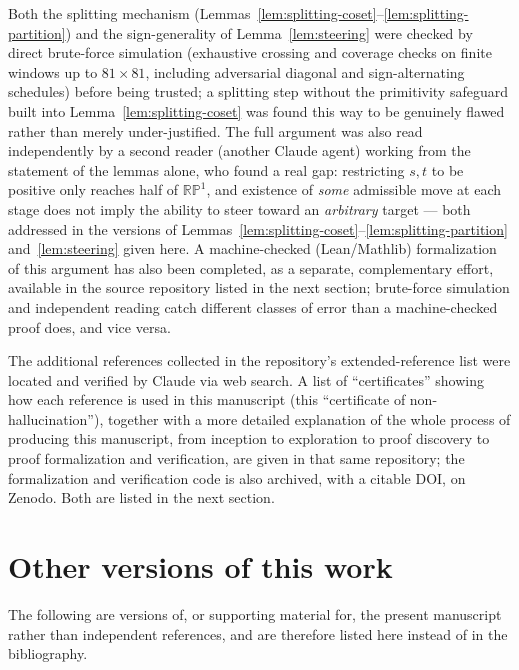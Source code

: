 \documentclass[a4paper,11pt,oneside,reqno]{amsart}
\theoremstyle{definition}
\theoremstyle{remark}
\theoremstyle{plain}
\newcommand{\RP}{\mathbb{RP}^1}
\begin{document}
Both the splitting mechanism (Lemmas~\ref{lem:splitting-coset}--\ref{lem:splitting-partition}) and
the sign-generality of Lemma~\ref{lem:steering} were checked by direct brute-force simulation
(exhaustive crossing and coverage checks on finite windows up to \(81\times81\), including
adversarial diagonal and sign-alternating schedules) before being trusted; a splitting step
without the primitivity safeguard built into Lemma~\ref{lem:splitting-coset} was found this way to
be genuinely flawed rather than merely under-justified. The full argument was also read
independently by a second reader (another Claude agent) working from the statement of the lemmas
alone, who found a real gap: restricting \(s,t\) to be positive only reaches half of \(\RP\), and
existence of \emph{some} admissible move at each stage does not imply the ability to steer toward
an \emph{arbitrary} target --- both addressed in the versions of
Lemmas~\ref{lem:splitting-coset}--\ref{lem:splitting-partition} and~\ref{lem:steering} given here.
A machine-checked (Lean/Mathlib) formalization of this argument has also been completed, as a
separate, complementary effort, available in the source repository listed in the next section;
brute-force simulation and independent reading catch different classes of error than a
machine-checked proof does, and vice versa.

The additional references collected in the repository's extended-reference list were located and
verified by Claude via web search. A list of ``certificates'' showing how each reference is used in
this manuscript (this ``certificate of non-hallucination''), together with a more detailed
explanation of the whole process of producing this manuscript, from inception to exploration to
proof discovery to proof formalization and verification, are given in that same repository; the
formalization and verification code is also archived, with a citable DOI, on Zenodo. Both are
listed in the next section.

\section*{Other versions of this work}

The following are versions of, or supporting material for, the present manuscript rather than
independent references, and are therefore listed here instead of in the bibliography.
\end{document}
